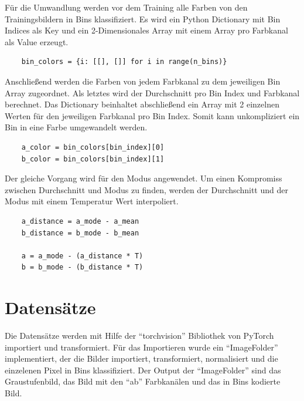 Für die Umwandlung werden vor dem Training alle Farben von den Trainingsbildern in Bins klassifiziert. Es wird ein Python Dictionary mit Bin
Indices als Key und ein 2-Dimensionales Array mit einem Array pro Farbkanal als Value erzeugt.

\begin{listing}[H]
  \begin{verbatim}
    bin_colors = {i: [[], []] for i in range(n_bins)}
  \end{verbatim}
\end{listing}

Anschließend werden die Farben von jedem Farbkanal zu dem jeweiligen Bin Array zugeordnet. Als letztes wird der Durchschnitt pro Bin Index
und Farbkanal berechnet. Das Dictionary beinhaltet abschließend ein Array mit 2 einzelnen Werten für den jeweiligen Farbkanal pro Bin Index.
Somit kann unkompliziert ein Bin in eine Farbe umgewandelt werden.

\begin{listing}[H]
  \begin{verbatim}
    a_color = bin_colors[bin_index][0]
    b_color = bin_colors[bin_index][1]
  \end{verbatim}
\end{listing}

Der gleiche Vorgang wird für den Modus angewendet. Um einen Kompromiss zwischen Durchschnitt und Modus zu finden, werden der Durchschnitt
und der Modus mit einem Temperatur Wert interpoliert.

\begin{listing}[H]
  \begin{verbatim}
    a_distance = a_mode - a_mean
    b_distance = b_mode - b_mean

    a = a_mode - (a_distance * T)
    b = b_mode - (b_distance * T)
  \end{verbatim}
\end{listing}

\section{Datensätze}
Die Datensätze werden mit Hilfe der ``torchvision'' Bibliothek von PyTorch importiert und transformiert. Für das Importieren wurde ein
``ImageFolder'' implementiert, der die Bilder importiert, transformiert, normalisiert und die einzelenen Pixel in Bins klassifiziert.
Der Output der ``ImageFolder'' sind das Graustufenbild, das Bild mit den ``ab'' Farbkanälen und das in Bins kodierte Bild.

